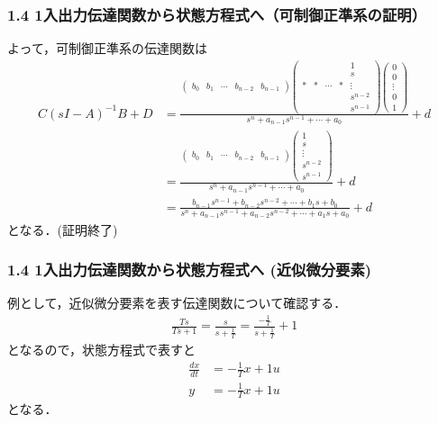 \begin{frame}[t]
\frametitle{1.4 1入出力伝達関数から状態方程式へ{\small （可制御正準系の証明）}}
よって，可制御正準系の伝達関数は
{\tiny
\begin{align}
 C(sI-A)^{-1}B + D
 &=
 \frac{
    \left(\begin{array}{ccccc}
        b_0 & b_1 & \cdots & b_{n-2} & b_{n-1}
    \end{array}\right)
    \left(\begin{array}{ccccc}
        &    &        &    &  1 \\
	    &    &        &    &  s \\
	  * &  * & \cdots &  * &  \vdots \\
	    &    &        &    &  s^{n-2} \\
	    &    &        &    &  s^{n-1}
	\end{array}\right)
    \left(\begin{array}{c}
         0 \\
	 0 \\
	 \vdots \\
	 0 \\
	 1
	\end{array}\right)
 }
 {s^n + a_{n-1} s^{n-1}  + \cdots + a_0}
    + d
\nonumber\\[1cm]
 &=
 \frac{
    \left(\begin{array}{ccccc}
        b_0 & b_1 & \cdots & b_{n-2} & b_{n-1}
    \end{array}\right)
    \left(\begin{array}{c}
     1 \\
	 s \\
	 \vdots \\
	 s^{n-2} \\
	 s^{n-1}
	\end{array}\right)
 }
 {s^n + a_{n-1} s^{n-1}  + \cdots + a_0}
    + d
\nonumber \\[1cm]
 &=
   \frac{b_{n-1} s^{n-1} + b_{n-2} s^{n-2} + \cdots + b_1 s + b_0}
  {s^n + a_{n-1} s^{n-1} + a_{n-2} s^{n-2} + \cdots + a_1 s + a_0}
  + d
\end{align}
}
となる．(証明終了)
\end{frame}

\begin{frame}[t]
\frametitle{1.4 1入出力伝達関数から状態方程式へ{ (近似微分要素)}}
例として，近似微分要素を表す伝達関数について確認する．
\begin{align}
 \frac{Ts}{Ts+1} = \frac{s}{s+\frac{1}{T}}
 = \frac{-\frac{1}{T}}{s+\frac{1}{T}} + 1
\end{align}
となるので，状態方程式で表すと
\begin{align}
 \frac{dx}{dt} &= -\frac{1}{T} x + 1u \\
 y             &= -\frac{1}{T} x + 1u
\end{align}
となる．
\end{frame}

